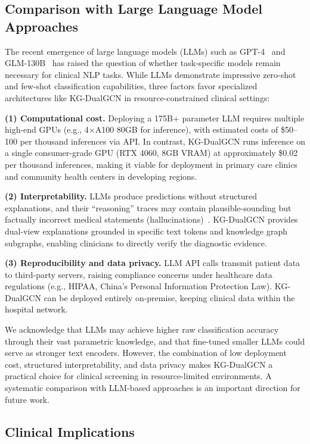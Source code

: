 \documentclass[11pt,onecolumn,a4paper]{article}
\begin{document}
\subsection{Comparison with Large Language Model Approaches}

The recent emergence of large language models (LLMs) such as GPT-4~\cite{openai2023gpt4} and GLM-130B~\cite{zeng2023glm} has raised the question of whether task-specific models remain necessary for clinical NLP tasks. While LLMs demonstrate impressive zero-shot and few-shot classification capabilities, three factors favor specialized architectures like KG-DualGCN in resource-constrained clinical settings:

\textbf{(1) Computational cost.} Deploying a 175B+ parameter LLM requires multiple high-end GPUs (e.g., 4$\times$A100 80GB for inference), with estimated costs of \$50--100 per thousand inferences via API. In contrast, KG-DualGCN runs inference on a single consumer-grade GPU (RTX 4060, 8GB VRAM) at approximately \$0.02 per thousand inferences, making it viable for deployment in primary care clinics and community health centers in developing regions.

\textbf{(2) Interpretability.} LLMs produce predictions without structured explanations, and their ``reasoning'' traces may contain plausible-sounding but factually incorrect medical statements (hallucinations)~\cite{huang2023hallucination}. KG-DualGCN provides dual-view explanations grounded in specific text tokens and knowledge graph subgraphs, enabling clinicians to directly verify the diagnostic evidence.

\textbf{(3) Reproducibility and data privacy.} LLM API calls transmit patient data to third-party servers, raising compliance concerns under healthcare data regulations (e.g., HIPAA, China's Personal Information Protection Law). KG-DualGCN can be deployed entirely on-premise, keeping clinical data within the hospital network.

We acknowledge that LLMs may achieve higher raw classification accuracy through their vast parametric knowledge, and that fine-tuned smaller LLMs could serve as stronger text encoders. However, the combination of low deployment cost, structured interpretability, and data privacy makes KG-DualGCN a practical choice for clinical screening in resource-limited environments. A systematic comparison with LLM-based approaches is an important direction for future work.

\subsection{Clinical Implications}
\end{document}
